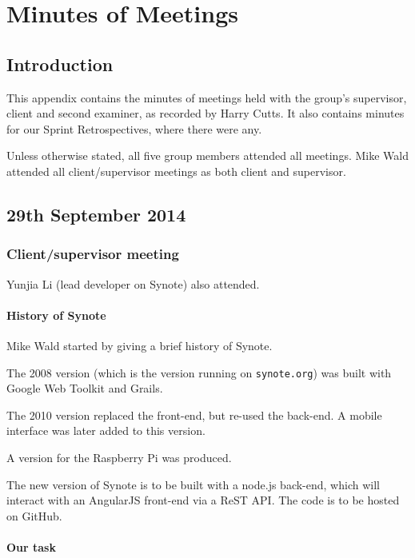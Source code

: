 \chapter{Minutes of Meetings} \label{Chapter:Minutes of Meetings}


\section{Introduction}

This appendix contains the minutes of meetings held with the group's supervisor, client and second examiner, as recorded by Harry Cutts. It also contains minutes for our Sprint Retrospectives, where there were any.

Unless otherwise stated, all five group members attended all meetings. Mike Wald attended all client/supervisor meetings as both client and supervisor.

\section{29th September 2014}\label{Minutes:2014-09-29}

\subsection{Client/supervisor meeting}

Yunjia Li (lead developer on Synote) also attended.

\subsubsection{History of Synote}

Mike Wald started by giving a brief history of Synote.

The 2008 version (which is the version running on \texttt{synote.org})
was built with Google Web Toolkit and Grails.

The 2010 version replaced the front-end, but re-used the back-end. A
mobile interface was later added to this version.

A version for the Raspberry Pi was produced.

The new version of Synote is to be built with a node.js back-end, which
will interact with an AngularJS front-end via a ReST API. The code is to
be hosted on GitHub.

\subsubsection{Our task}

